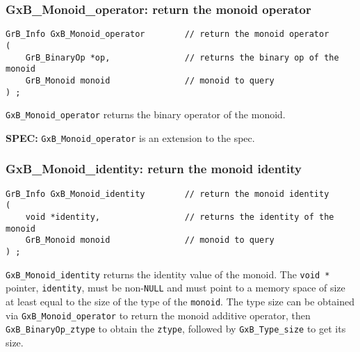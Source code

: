 \documentclass[12pt]{article}
\begin{document}
\subsubsection{{\sf GxB\_Monoid\_operator:} return the monoid operator}
\label{monoid_operator}

\begin{mdframed}[userdefinedwidth=6in]
{\footnotesize
\begin{verbatim}
GrB_Info GxB_Monoid_operator        // return the monoid operator
(
    GrB_BinaryOp *op,               // returns the binary op of the monoid
    GrB_Monoid monoid               // monoid to query
) ;
\end{verbatim}
} \end{mdframed}

\verb'GxB_Monoid_operator' returns the binary operator of the monoid.

\begin{spec}
{\bf SPEC:} \verb'GxB_Monoid_operator' is an extension to the spec.
\end{spec}

\subsubsection{{\sf GxB\_Monoid\_identity:} return the monoid identity}

\begin{mdframed}[userdefinedwidth=6in]
{\footnotesize
\begin{verbatim}
GrB_Info GxB_Monoid_identity        // return the monoid identity
(
    void *identity,                 // returns the identity of the monoid
    GrB_Monoid monoid               // monoid to query
) ;
\end{verbatim}
} \end{mdframed}

\verb'GxB_Monoid_identity' returns the identity value of the monoid.  The
\verb'void *' pointer, \verb'identity', must be non-\verb'NULL' and must point
to a memory space of size at least equal to the size of the type of the
\verb'monoid'.  The type size can be obtained via \verb'GxB_Monoid_operator' to
return the monoid additive operator, then \verb'GxB_BinaryOp_ztype' to obtain
the \verb'ztype', followed by \verb'GxB_Type_size' to get its size.
\end{document}
